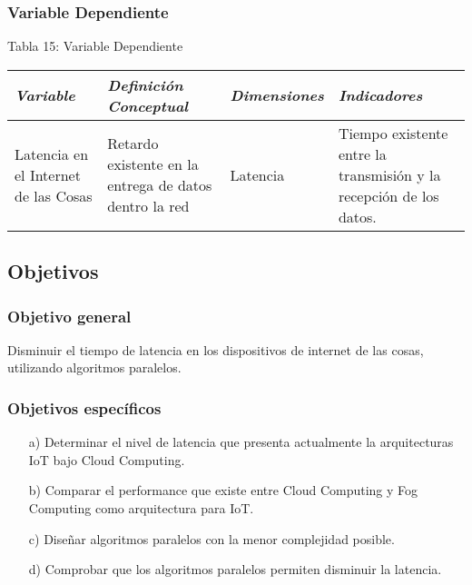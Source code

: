         \subsubsection{Variable Dependiente}
            \begin{table}[h!]
                \centering
                { Tabla 15: Variable Dependiente}\par
                \begin{tabular}{|p{3cm}|p{3cm}|p{3cm}|p{3cm}|} \hline
                    
                
                \textit{{\bf{Variable}}} &
                \textit{{\bf{Definición Conceptual}}} &
                \textit{{\bf{Dimensiones}}} &
                \textit{{\bf{Indicadores}}}
                \\ \hline

                Latencia en el Internet de las Cosas &
                Retardo existente en la entrega de datos dentro la red &
                Latencia &
                Tiempo existente entre la transmisión y la recepción de los datos. 
                \\ \hline

                \end{tabular}
            \end{table}
    \subsection{Objetivos}
        \subsubsection{Objetivo general}
            Disminuir el tiempo de latencia en los dispositivos de internet de las cosas, utilizando algoritmos paralelos.
        \subsubsection{Objetivos específicos}
            \begin{enumerate}
                \item[a)] Determinar el nivel de latencia que presenta actualmente la arquitecturas IoT bajo Cloud Computing.
                \item[b)] Comparar el performance que existe entre Cloud Computing y Fog Computing como arquitectura para IoT. 
                \item[c)] Diseñar algoritmos  paralelos con la menor complejidad posible.
                \item[d)] Comprobar que los algoritmos paralelos permiten disminuir la latencia.
            \end{enumerate}
